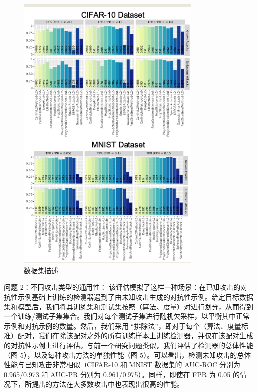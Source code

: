 \documentclass[12pt, a4paper]{ctexart} %
\begin{document}
\begin{figure}[H]
    \centering
    \includegraphics[width=0.8\textwidth]{img/adversaries_8.png}
    \caption{数据集描述}
\end{figure}


问题 2：不同攻击类型的通用性： 该评估模拟了这样一种场景：在已知攻击的对抗性示例基础上训练的检测器遇到了由未知攻击生成的对抗性示例。给定目标数据集和模型后，我们将其训练集和测试集按照（算法、度量）对进行划分，从而得到一个训练/测试子集集合。我们对每个测试子集进行随机欠采样，以平衡其中正常示例和对抗示例的数量。然后，我们采用 “排除法”，即对于每个（算法、度量标准）配对，我们在除该配对之外的所有训练样本上训练检测器，并仅在该配对生成的对抗性示例上进行评估。与前一个研究问题类似，我们评估了检测器的总体性能（图 5），以及每种攻击方法的单独性能（图 5）。可以看出，检测未知攻击的总体性能与已知攻击非常相似（CIFAR-10 和 MNIST 数据集的 AUC-ROC 分别为 0.965/0.973 和 AUC-PR 分别为 0.961/0.975）。同样，即使在 FPR 为 0.05 的情况下，所提出的方法在大多数攻击中也表现出很高的性能。
\end{document}
